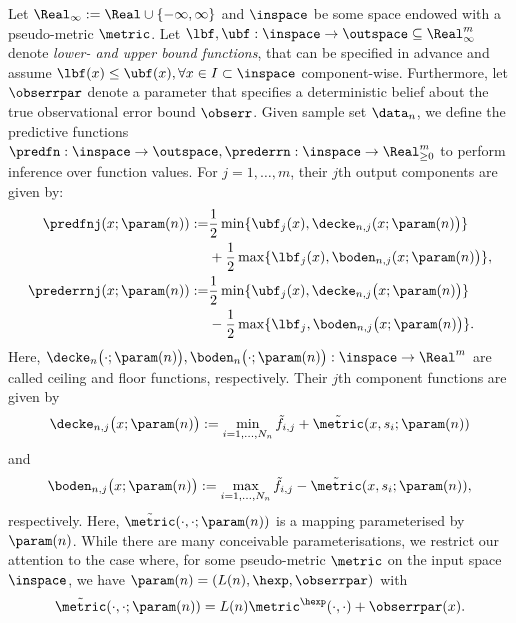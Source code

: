 \begin{defn} \label{def:KIL}
Let  $\Real_\infty := \Real \cup\{- \infty, \infty\}$ and $\inspace$ be some space endowed with a pseudo-metric $\metric$. Let $\lbf,\ubf: \inspace \to \outspace \subseteq \Real_\infty^m$ denote \textit{lower- and upper bound functions}, that can be specified in advance and assume $\lbf(x) \leq \ubf(x), \forall x \in I \subset \inspace$ component-wise. 
Furthermore, let $\obserrpar$ denote a parameter that specifies a deterministic belief about the true observational error bound $\obserr$.
Given sample set $\data_n$, we define the predictive functions $\predfn: \inspace \to \outspace, \prederrn: \inspace \to \Real^m_{\geq 0}$ to perform inference over function values.
For $j=1,\ldots,m$, their $j$th output components are given by:
	\begin{align*}
   \predfnj(x; \param(n)) :=& \frac{1}{2} \min\{ \ubf_j(x), \decke_{n,j}(x;\param(n)\bigr)\} \\
    &+ \frac{1}{2} \max\{ \lbf_j(x), \boden_{n,j}(x;\param(n)\bigr) \},\\
	\prederrnj(x; \param(n)) :=& \frac{1}{2} \min\{ \ubf_j(x), \decke_{n,j}\bigl(x;\param(n)\bigr)\} \\
	&- \frac{1}{2} \max\{ \lbf_j, \boden_{n,j}\bigl(x;\param(n)\bigr) \}.
	\end{align*}
	Here, $\decke_n\bigl(\cdot;\param(n)\bigr), \boden_n\bigl(\cdot;\param(n)\bigr): \inspace \to \Real^m$ are called ceiling and floor functions, respectively. Their $j$th component functions are given by
	\[\decke_{n,j}\bigl(x; \param(n)\bigr) := \min_{i=1,\ldots,N_n}   \tilde f_{i,j} +  \tilde \metric(x,s_i;\param(n)) \] and 
	\[\boden_{n,j}\bigl(x; \param(n)\bigr) := \max_{i=1,\ldots,N_n}   \tilde f_{i,j} -  \tilde  \metric(x,s_i;\param(n)),\] respectively.
  Here, $\tilde \metric (\cdot,\cdot;\param(n))$ is a mapping parameterised by $ \param(n)$. While there are many conceivable parameterisations, we restrict our attention to the case where, for some pseudo-metric $\metric$ on the input space $\inspace$, we have $\param(n) = (L(n), \hexp,\obserrpar)$ with $$\tilde \metric(\cdot,\cdot; \param(n)) = L(n) \metric^\hexp(\cdot,\cdot) + \obserrpar(x).$$

\end{defn}

